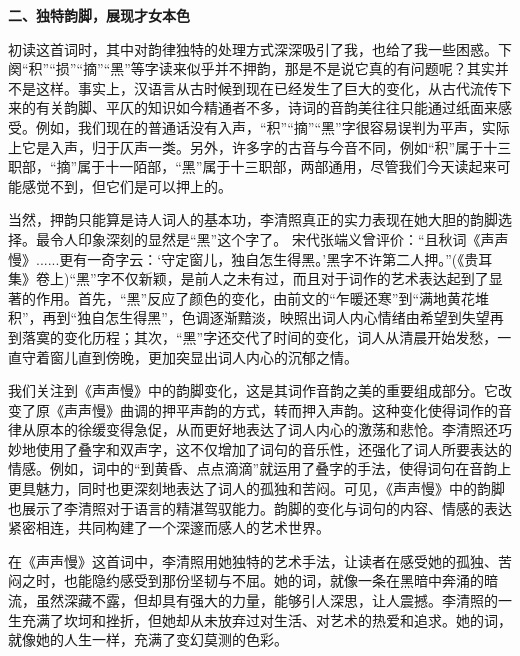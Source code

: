 \documentclass[UTF8, zihao=5, a4paper, oneside]{ctexart}
\newcommand{\makenewtitle}[1]{\setlength{\parskip}{0.5em}\textbf{#1}\setlength{\parskip}{0em}}
\begin{document}
    \makenewtitle{二、独特韵脚，展现才女本色}

    初读这首词时，其中对韵律独特的处理方式深深吸引了我，也给了我一些困惑。下阕“积”“损”“摘”“黑”等字读来似乎并不押韵，那是不是说它真的有问题呢？其实并不是这样。事实上，汉语言从古时候到现在已经发生了巨大的变化，从古代流传下来的有关韵脚、平仄的知识如今精通者不多，诗词的音韵美往往只能通过纸面来感受。例如，我们现在的普通话没有入声，“积”“摘”“黑”字很容易误判为平声，实际上它是入声，归于仄声一类。另外，许多字的古音与今音不同，例如“积”属于十三职部，“摘”属于十一陌部，“黑”属于十三职部，两部通用，尽管我们今天读起来可能感觉不到，但它们是可以押上的。

    当然，押韵只能算是诗人词人的基本功，李清照真正的实力表现在她大胆的韵脚选择。最令人印象深刻的显然是“黑”这个字了。 宋代张端义曾评价：“且秋词《声声慢》......更有一奇字云：‘守定窗儿，独自怎生得黑。’黑字不许第二人押。”(《贵耳集》卷上)“黑”字不仅新颖，是前人之未有过，而且对于词作的艺术表达起到了显著的作用。首先，“黑”反应了颜色的变化，由前文的“乍暖还寒”到“满地黄花堆积”，再到“独自怎生得黑”，色调逐渐黯淡，映照出词人内心情绪由希望到失望再到落寞的变化历程；其次，“黑”字还交代了时间的变化，词人从清晨开始发愁，一直守着窗儿直到傍晚，更加突显出词人内心的沉郁之情。

    我们关注到《声声慢》中的韵脚变化，这是其词作音韵之美的重要组成部分。它改变了原《声声慢》曲调的押平声韵的方式，转而押入声韵。这种变化使得词作的音律从原本的徐缓变得急促，从而更好地表达了词人内心的激荡和悲怆。李清照还巧妙地使用了叠字和双声字，这不仅增加了词句的音乐性，还强化了词人所要表达的情感。例如，词中的“到黄昏、点点滴滴”就运用了叠字的手法，使得词句在音韵上更具魅力，同时也更深刻地表达了词人的孤独和苦闷。可见，《声声慢》中的韵脚也展示了李清照对于语言的精湛驾驭能力。韵脚的变化与词句的内容、情感的表达紧密相连，共同构建了一个深邃而感人的艺术世界。

    \setlength{\parskip}{1em}
    在《声声慢》这首词中，李清照用她独特的艺术手法，让读者在感受她的孤独、苦闷之时，也能隐约感受到那份坚韧与不屈。她的词，就像一条在黑暗中奔涌的暗流，虽然深藏不露，但却具有强大的力量，能够引人深思，让人震撼。李清照的一生充满了坎坷和挫折，但她却从未放弃过对生活、对艺术的热爱和追求。她的词，就像她的人生一样，充满了变幻莫测的色彩。
\end{document}
